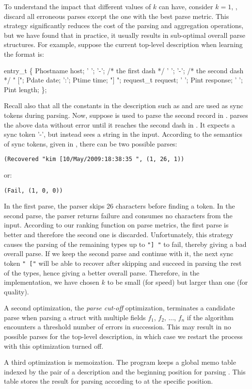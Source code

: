 To understand the impact that different values of $k$ can have,
consider $k=1$, \ie{}, discard all erroneous parses except
the one with the best parse metric. This strategy significantly reduces the
cost of the parsing and aggregation operations, but we have found
that in practice,
it usually results in sub-optimal overall parse structures. 
For example, suppose the current top-level description  when learning 
the \ai{} format is:
\begin{code}
  entry_t \{
         Phostname      host;
   ' ';  
   '-';  /* the first dash */
   ' ';  
   '-';	 /* the second dash */   
   " ["; Pdate          date;
   ':';  Ptime          time;
   "] "; request_t      request;
   ' ';  Pint           response;
   ' ';  Pint           length;
\};
\end{code}
Recall also that all the constants in the description such as
 and  are used as sync tokens during
parsing. Now, suppose  is used to parse the second record 
in .
 parses the above data without error until it
reaches the second dash in . It expects a sync token
'-', but instead sees a string  in the input.
According to the semantics of sync tokens, given in ,
there can be two possible parses:

\noindent
{\footnotesize
\verb#(Recovered "kim [10/May/2009:18:38:35 ", (1, 26, 1))#
}

\noindent
or:

\noindent
{\footnotesize
\verb#(Fail, (1, 0, 0))#
}

In the first parse, the parser skips 26 characters before finding a  token.
In the second parse, the parser returns failure and consumes no characters
from the input.
According to our ranking function on parse metrics, 
the first parse is better and therefore the
second one is discarded. Unfortunately, this strategy causes the parsing of the
remaining types up to \verb#"] "# to fail, thereby giving a bad overall parse.
If we keep the second parse and continue with it, the next sync token 
\verb#" ["# will be able to recover after skipping  and succeed
in parsing the rest of the types, hence giving a better overall parse.
Therefore, in the implementation, we have chosen $k$ to be small 
(for speed) but larger than one (for quality).

A second optimization, the {\em parse cut-off} optimization, terminates a
candidate parse when parsing a struct with multiple
fields $f_1$, $f_2$, ..., $f_n$ if the algorithm encounters 
a threshold number of errors in succession. 
This may result in no possible parses for the
top-level description, in which case we restart the process
with this optimization turned off. 

A third optimization is memoization.
The program keeps a global memo table indexed by the pair of a
description  and the beginning position for parsing .  This table
stores the result for parsing according to  at the specific position.



